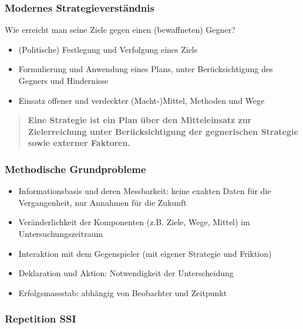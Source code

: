 {}\documentclass[a4paper]{article}
\providecommand{\tightlist}{\setlength{\itemsep}{1mm}\setlength{\parskip}{1mm}}
\begin{document}
\subsubsection{Modernes
	Strategieverständnis}\label{modernes-strategieverstuxe4ndnis}

Wie erreicht man seine Ziele gegen einen (bewaffneten) Gegner?

\begin{itemize}
	\tightlist
	\item
	      (Politische) Festlegung und Verfolgung eines Ziels
	\item
	      Formulierung und Anwendung eines Plans, unter Berücksichtigung des
	      Gegners und Hindernisse
	\item
	      Einsatz offener und verdeckter (Macht-)Mittel, Methoden und Wege
\end{itemize}

\begin{quote}
	\textbf{Eine Strategie ist ein Plan über den Mitteleinsatz zur
		Zielerreichung unter Berücksichtigung der gegnerischen Strategie sowie
		externer Faktoren.}
\end{quote}

\subsubsection{Methodische
	Grundprobleme}\label{methodische-grundprobleme}

\begin{itemize}
	\tightlist
	\item
	      Informationsbasis und deren Messbarkeit: keine exakten Daten für die
	      Vergangenheit, nur Annahmen für die Zukunft
	\item
	      Veränderlichkeit der Komponenten (z.B. Ziele, Wege, Mittel) im
	      Untersuchungszeitraum
	\item
	      Interaktion mit dem Gegenspieler (mit eigener Strategie und Friktion)
	\item
	      Deklaration und Aktion: Notwendigkeit der Unterscheidung
	\item
	      Erfolgsmassstab: abhängig von Beobachter und Zeitpunkt
\end{itemize}

\subsubsection{Repetition SSI}\label{repetition-ssi}
\end{document}
